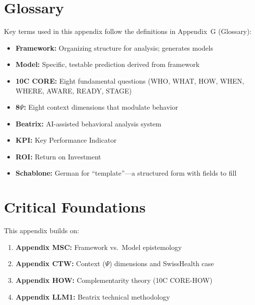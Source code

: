 

\section{Glossary}
\label{sec:consulting-glossary}

Key terms used in this appendix follow the definitions in Appendix~G (Glossary):
\begin{itemize}[nosep]
    \item \textbf{Framework:} Organizing structure for analysis; generates models
    \item \textbf{Model:} Specific, testable prediction derived from framework
    \item \textbf{10C CORE:} Eight fundamental questions (WHO, WHAT, HOW, WHEN, WHERE, AWARE, READY, STAGE)
    \item \textbf{8$\Psi$:} Eight context dimensions that modulate behavior
    \item \textbf{Beatrix:} AI-assisted behavioral analysis system
    \item \textbf{KPI:} Key Performance Indicator
    \item \textbf{ROI:} Return on Investment
    \item \textbf{Schablone:} German for ``template''---a structured form with fields to fill
\end{itemize}


\section{Critical Foundations}
\label{sec:consulting-foundations}

This appendix builds on:
\begin{enumerate}[nosep]
    \item \textbf{Appendix MSC:} Framework vs.\ Model epistemology
    \item \textbf{Appendix CTW:} Context ($\Psi$) dimensions and SwissHealth case
    \item \textbf{Appendix HOW:} Complementarity theory (10C CORE-HOW)
    \item \textbf{Appendix LLM1:} Beatrix technical methodology
\end{enumerate}


